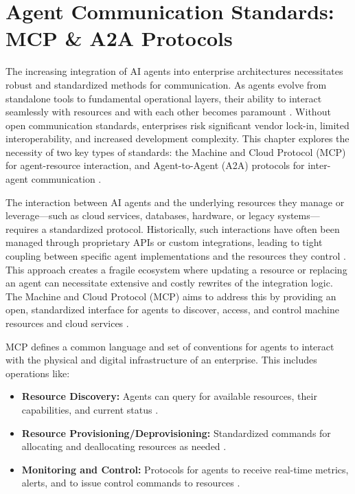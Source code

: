 \section{Agent Communication Standards: MCP \& A2A Protocols}

The increasing integration of AI agents into enterprise architectures necessitates robust and standardized methods for communication. As agents evolve from standalone tools to fundamental operational layers, their ability to interact seamlessly with resources and with each other becomes paramount \cite{Reger2026}. Without open communication standards, enterprises risk significant vendor lock-in, limited interoperability, and increased development complexity. This chapter explores the necessity of two key types of standards: the Machine and Cloud Protocol (MCP) for agent-resource interaction, and Agent-to-Agent (A2A) protocols for inter-agent communication \cite{MCPspec, LinuxFoundationA2A}.

The interaction between AI agents and the underlying resources they manage or leverage—such as cloud services, databases, hardware, or legacy systems—requires a standardized protocol. Historically, such interactions have often been managed through proprietary APIs or custom integrations, leading to tight coupling between specific agent implementations and the resources they control \cite{Reger2026}. This approach creates a fragile ecosystem where updating a resource or replacing an agent can necessitate extensive and costly rewrites of the integration logic. The Machine and Cloud Protocol (MCP) aims to address this by providing an open, standardized interface for agents to discover, access, and control machine resources and cloud services \cite{MCPspec}.

MCP defines a common language and set of conventions for agents to interact with the physical and digital infrastructure of an enterprise. This includes operations like:

\begin{itemize}
  \item \textbf{Resource Discovery:} Agents can query for available resources, their capabilities, and current status \cite{MCPspec}.
  \item \textbf{Resource Provisioning/Deprovisioning:} Standardized commands for allocating and deallocating resources as needed \cite{MCPspec}.
  \item \textbf{Monitoring and Control:} Protocols for agents to receive real-time metrics, alerts, and to issue control commands to resources \cite{MCPspec}.
\end{itemize}

